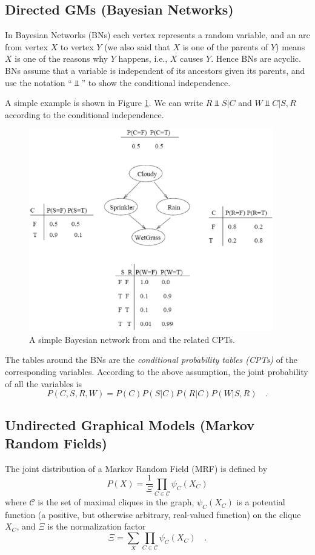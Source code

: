 \documentclass{article}
\begin{document}
\subsection{Directed GMs (Bayesian Networks) \cite{Murphy}}
In Bayesian Networks (BNs) each vertex represents a random variable, and an arc
from vertex $X$ to vertex $Y$ (we also said that $X$ is one of the parents of $Y$)
means $X$ is one of the reasons why $Y$ happens, i.e., $X$ causes $Y$.
Hence BNs are acyclic.
BNs assume that a variable is independent of its ancestors given its parents,
and use the notation ``$\Perp$'' to show the conditional independence.

A simple example is shown in Figure \ref{wetgrass}.
We can write $R\!\!\Perp\!\!S|C$ and $W\!\!\Perp\!\!C|S,R$ according to the conditional independence.
\begin{figure}[h]
\centering
\includegraphics[trim=0 10 0 0,width=0.95\textwidth]{wetgrass2.eps}
\caption{A simple Bayesian network from \cite{Russell} and the related CPTs.}\label{wetgrass}
\end{figure}
The tables around the BNs are the \textit{conditional probability tables (CPTs)} of the
corresponding variables.
According to the above assumption, the joint probability of all the variables is
$$
P(C, S, R, W) = P(C)  P(S|C)  P(R|C)  P(W|S,R) \quad .
$$

\subsection{Undirected Graphical Models (Markov Random Fields) \cite{Murphy}}
The joint distribution of a Markov Random Field (MRF) is defined by
\begin{equation}
P(X) = \frac{1}{\Xi} \prod_{C\in\mathcal{C}} \psi_C(X_C)
\end{equation}
where $\mathcal{C}$ is the set of maximal cliques in the graph, $\psi_C(X_C)$ is a potential
function (a positive, but otherwise arbitrary, real-valued function) on the clique $X_C$,
and $\Xi$ is the normalization factor
\begin{equation}
\Xi = \sum_X \prod_{C\in\mathcal{C}} \psi_C(X_C) \quad .
\end{equation}
\end{document}
